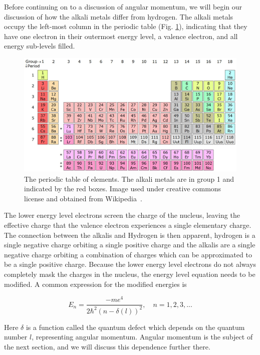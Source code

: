 \documentclass[12pt]{article}
\begin{document}
		Before continuing on to a discussion of angular momentum, 
		we will begin our discussion of how the alkali metals differ
		from hydrogen. The alkali metals occupy the left-most
		column in the periodic table (Fig. \ref{periodicTable}), 
		indicating that they have one
		electron in their outermost energy level, a valence electron,
		and all energy sub-levels filled. 
		\begin{figure}[ht]
			\centering
			\includegraphics[width=\textwidth]{periodicTable}
			\caption{\label{periodicTable}The periodic table 
				of elements. The alkali metals 
			are in group 1 and indicated by the red boxes. Image
			used under creative commons license and obtained
			from Wikipedia~\cite{periodicWiki}.}
		\end{figure}
		The lower energy level
		electrons screen the charge of the nucleus, leaving the effective
		charge that the valence electron experiences 
        a single elementary charge. The connection between the alkalis
		and Hydrogen is then apparent, hydrogen is a single negative charge
		orbiting a single positive charge and the alkalis are a single
		negative charge orbiting a combination of charges which 
		can be approximated to be a single positive charge.
        Because the lower energy level electrons do not always completely
		mask the charges in the nucleus, the energy level equation 
		needs to be modified. A common
        expression for the modified energies is

		\begin{equation}\label{modEnergy}
            E_n=\frac{-me^4}{2\hbar^2(n-\delta(l))^2},\quad n=1,2,3,...
		\end{equation}

        Here $\delta$ is a function called the quantum defect which
        depends on the quantum number $l$, representing angular momentum.
        Angular momentum is the subject of the next section, and we 
        will discuss this dependence further there.
\end{document}
